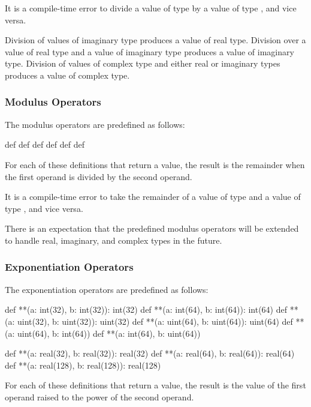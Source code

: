 It is a compile-time error to divide a value of type  by
a value of type , and vice versa.

Division of values of imaginary type produces a value of real type.
Division over a value of real type and a value of imaginary type
produces a value of imaginary type.  Division of values of complex
type and either real or imaginary types produces a value of complex
type.

\subsubsection{Modulus Operators}
\label{Modulus_Operators}

The modulus operators are predefined as follows:
\begin{chapel}
def %
def %
def %
def %
def %
def %
\end{chapel}
For each of these definitions that return a value, the result is the
remainder when the first operand is divided by the second operand.

It is a compile-time error to take the remainder of a value of
type  and a value of type , and vice
versa.

There is an expectation that the predefined modulus operators will be
extended to handle real, imaginary, and complex types in the future.

\subsubsection{Exponentiation Operators}
\label{Exponentiation_Operators}

The exponentiation operators are predefined as follows:
\begin{chapel}
def **(a: int(32), b: int(32)): int(32)
def **(a: int(64), b: int(64)): int(64)
def **(a: uint(32), b: uint(32)): uint(32)
def **(a: uint(64), b: uint(64)): uint(64)
def **(a: uint(64), b: int(64))
def **(a: int(64), b: uint(64))

def **(a: real(32), b: real(32)): real(32)
def **(a: real(64), b: real(64)): real(64)
def **(a: real(128), b: real(128)): real(128)
\end{chapel}
For each of these definitions that return a value, the result is the
value of the first operand raised to the power of the second operand.

